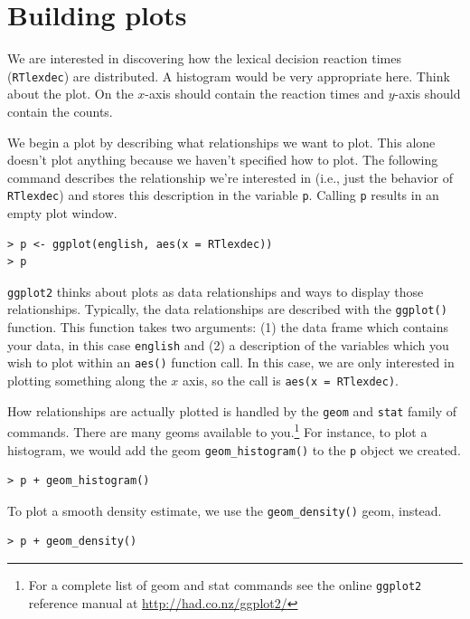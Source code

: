\documentclass[oneside,10pt]{article}
\begin{document}
\section{Building plots}

We are interested in discovering how the lexical decision reaction times (\texttt{RTlexdec}) are distributed. A histogram would be very appropriate here. Think about the plot. On the $x$-axis should contain the reaction times and $y$-axis should contain the counts.

We begin a plot by describing what relationships we want to plot. This alone doesn't plot anything because we haven't specified how to plot. The following command describes the relationship we're interested in (i.e., just the behavior of \texttt{RTlexdec}) and stores this description in the variable \texttt{p}. Calling \texttt{p} results in an empty plot window.

\begin{verbatim}
> p <- ggplot(english, aes(x = RTlexdec))
> p
\end{verbatim}

\texttt{ggplot2} thinks about plots as data relationships and ways to display those relationships. Typically, the data relationships are described with the \verb!ggplot()! function. This function takes two arguments: (1) the data frame which contains your data, in this case \verb!english! and (2)  a description of the variables which you wish to plot within an \verb!aes()! function call. In this case, we are only interested in plotting something along the $x$ axis, so the call is \verb!aes(x = RTlexdec)!.

How relationships are actually plotted is handled by the \texttt{geom} and \texttt{stat} family of commands. There are many geoms available to you.\footnote{For a complete list of geom and stat commands see the online \texttt{ggplot2} reference manual at \url{http://had.co.nz/ggplot2/}} For instance, to plot a histogram, we would add the geom \verb!geom_histogram()! to the \texttt{p} object we created.

\begin{verbatim}
> p + geom_histogram()
\end{verbatim}

To plot a smooth density estimate, we use the \texttt{geom\_density()} geom, instead.

\begin{verbatim}
> p + geom_density()
\end{verbatim}
\end{document}
